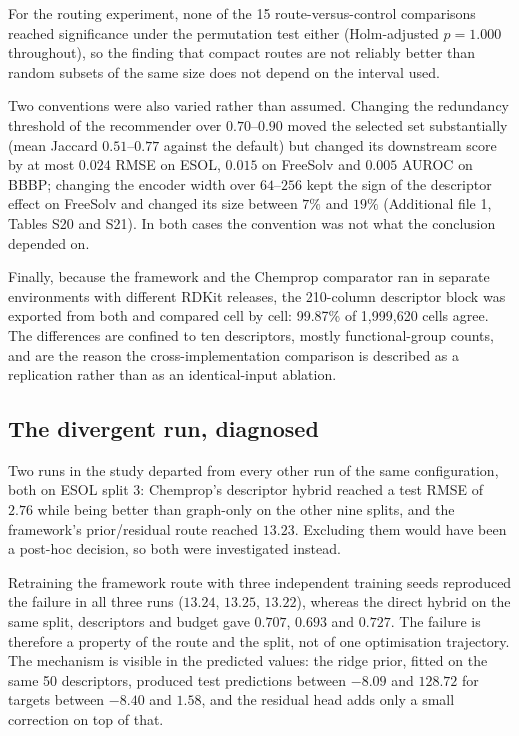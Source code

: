 For the routing experiment, none of the 15 route-versus-control comparisons reached significance under the permutation test either (Holm-adjusted $p=1.000$ throughout), so the finding that compact routes are not reliably better than random subsets of the same size does not depend on the interval used.

Two conventions were also varied rather than assumed. Changing the redundancy threshold of the recommender over $0.70$--$0.90$ moved the selected set substantially (mean Jaccard $0.51$--$0.77$ against the default) but changed its downstream score by at most $0.024$ RMSE on ESOL, $0.015$ on FreeSolv and $0.005$ AUROC on BBBP; changing the encoder width over $64$--$256$ kept the sign of the descriptor effect on FreeSolv and changed its size between $7\%$ and $19\%$ (Additional file 1, Tables S20 and S21). In both cases the convention was not what the conclusion depended on.

Finally, because the framework and the Chemprop comparator ran in separate environments with different RDKit releases, the 210-column descriptor block was exported from both and compared cell by cell: 99.87\% of 1{,}999{,}620 cells agree. The differences are confined to ten descriptors, mostly functional-group counts, and are the reason the cross-implementation comparison is described as a replication rather than as an identical-input ablation.

\subsection{The divergent run, diagnosed}\label{subsec:divergence-results}

Two runs in the study departed from every other run of the same configuration, both on ESOL split 3: Chemprop's descriptor hybrid reached a test RMSE of $2.76$ while being better than graph-only on the other nine splits, and the framework's prior/residual route reached $13.23$. Excluding them would have been a post-hoc decision, so both were investigated instead.

Retraining the framework route with three independent training seeds reproduced the failure in all three runs ($13.24$, $13.25$, $13.22$), whereas the direct hybrid on the same split, descriptors and budget gave $0.707$, $0.693$ and $0.727$. The failure is therefore a property of the route and the split, not of one optimisation trajectory. The mechanism is visible in the predicted values: the ridge prior, fitted on the same 50 descriptors, produced test predictions between $-8.09$ and $128.72$ for targets between $-8.40$ and $1.58$, and the residual head adds only a small correction on top of that.

